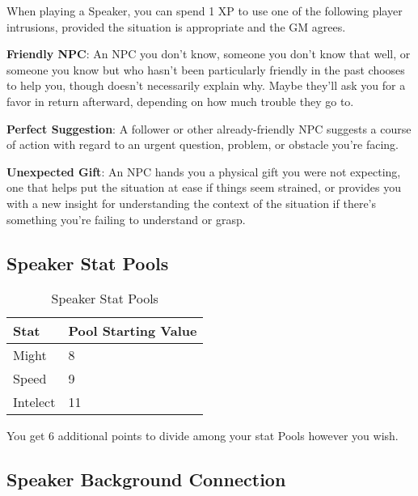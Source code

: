 When playing a Speaker, you can spend 1 XP to use one of the following player intrusions, provided the situation is appropriate and the GM agrees.

\textbf{Friendly NPC}: An NPC you don’t know, someone you don’t know that well, or someone you know but who hasn’t been particularly friendly in the past chooses to help you, though doesn’t necessarily explain why. Maybe they’ll ask you for a favor in return afterward, depending on how much trouble they go to.

\textbf{Perfect Suggestion}: A follower or other already-friendly NPC suggests a course of action with regard to an urgent question, problem, or obstacle you’re facing.

\textbf{Unexpected Gift}: An NPC hands you a physical gift you were not expecting, one that helps put the situation at ease if things seem strained, or provides you with a new insight for understanding the context of the situation if there’s something you’re failing to understand or grasp.

\subsection{Speaker Stat Pools}

\begin{table}[H]
\centering
\caption{Speaker Stat Pools}
\label{tab: Speaker Stat Pools}

\begin{tabularx}{\linewidth}{| X | X |}
\hline
\textbf{Stat} & \textbf{Pool Starting Value} \\
\hline
Might & 8 \\ \hline
Speed & 9 \\ \hline
Intelect & 11  \\ \hline

\end{tabularx}

\end{table}

\raggedright

You get 6 additional points to divide among your stat Pools however you wish. 

\subsection{Speaker Background Connection}

